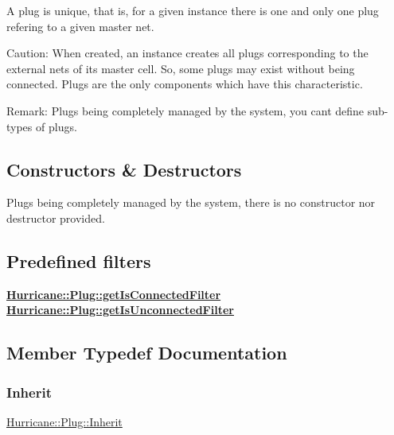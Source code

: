 A plug is unique, that is, for a given instance there is one and only one plug refering to a given master net.

\begin{DoxyParagraph}{Caution\+:}
When created, an instance creates all plugs corresponding to the external nets of its master cell. So, some plugs may exist without being connected. Plugs are the only components which have this characteristic.
\end{DoxyParagraph}
\begin{DoxyParagraph}{Remark\+:}
Plugs being completely managed by the system, you can\textquotesingle{}t define sub-\/types of plugs.
\end{DoxyParagraph}
\hypertarget{classHurricane_1_1Plug_secPlugConstructors}{}\subsection{Constructors \& Destructors}\label{classHurricane_1_1Plug_secPlugConstructors}
Plugs being completely managed by the system, there is no constructor nor destructor provided.\hypertarget{classHurricane_1_1Plug_secPlugPredefinedFilters}{}\subsection{Predefined filters}\label{classHurricane_1_1Plug_secPlugPredefinedFilters}
{\bfseries \hyperlink{classHurricane_1_1Plug_a51bd5d04a337544709950d7cace05f0d}{Hurricane\+::\+Plug\+::get\+Is\+Connected\+Filter}} {\bfseries \hyperlink{classHurricane_1_1Plug_af27b873ed2420329a63ea67dcc243f07}{Hurricane\+::\+Plug\+::get\+Is\+Unconnected\+Filter}} 

\subsection{Member Typedef Documentation}
\mbox{\label{classHurricane_1_1Plug_a71bee60105cbd9fdc5f0f2e5b793eeca}} 
\subsubsection{\texorpdfstring{Inherit}{Inherit}}
{\footnotesize\ttfamily \hyperlink{classHurricane_1_1Plug_a71bee60105cbd9fdc5f0f2e5b793eeca}{Hurricane\+::\+Plug\+::\+Inherit}}

